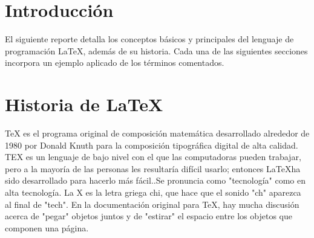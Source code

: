 \documentclass[letterpaper, 10pt, journal]{IEEEtran}
\begin{document}
\section{Introducci\'on}
El siguiente reporte detalla los conceptos b\'asicos y principales del lenguaje de programaci\'on LaTeX, adem\'as de su historia. Cada una de las siguientes secciones incorpora un ejemplo aplicado de los t\'erminos comentados.
\section{Historia de \LaTeX  }
TeX es el programa original de composici\'on matem\'atica desarrollado alrededor de 1980 por Donald Knuth  para la composici\'on tipogr\'afica digital de alta calidad.\cite{[3]} TEX es un lenguaje de bajo nivel con el que las computadoras pueden trabajar, pero a la mayor\'ia de las personas les resultar\'ia dif\'icil usarlo; entonces \LaTeX   ha sido desarrollado para hacerlo m\'as f\'acil.\cite{[2]}.Se pronuncia como "tecnolog\'ia" como en alta tecnolog\'ia. La X es la letra griega chi, que hace que el sonido "ch" aparezca al final de "tech". En la documentaci\'on original para TeX, hay mucha discusi\'on acerca de "pegar" objetos juntos y de "estirar" el espacio entre los objetos que componen una p\'agina. \cite{[3]}
\end{document}
